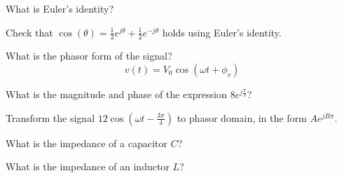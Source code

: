 
\begin{enumerate}


\qitem What is Euler's identity?

\ws{\vspace{30px}}


\qitem Check that $\cos(\theta)=\frac{1}{2}e^{j\theta}+\frac{1}{2}e^{-j\theta}$ holds using Euler's identity.

\ws{\vspace{30px}}



\qitem What is the phasor form of the signal?
\begin{equation}
v(t) = V_0 \cos(\omega t + \phi_v) \end{equation}
\ws{\vspace{30px}}


\qitem What is the magnitude and phase of the expression $8 e^{j \frac{\pi}{3}}$?

\ws{\vspace{30px}}



\qitem Transform the signal $12 \cos(\omega t - \frac{3\pi}{4})$ to phasor domain, in the form $A e^{jB\pi}$.

\ws{\vspace{30px}}



\qitem What is the impedance of a capacitor $C$?

\ws{\vspace{30px}}




\qitem What is the impedance of an inductor $L$?


\end{enumerate}
